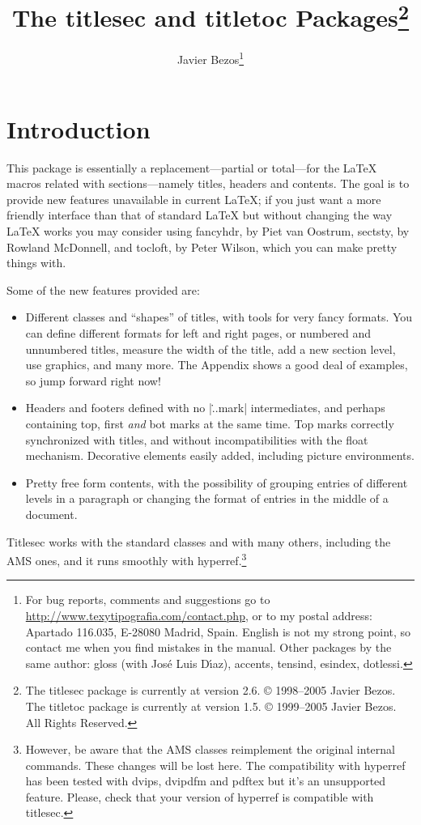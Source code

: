 \documentclass[a4paper]{ltxguide}
\title{The \textsf{titlesec} and \textsf{titletoc} 
Packages\footnote{The \textsf{titlesec} package is currently at 
version 2.6.  \copyright{} 1998--2005 Javier Bezos.
The \textsf{titletoc} package is currently at 
version 1.5.  \copyright{} 1999--2005 Javier Bezos.  All Rights 
Reserved.}}
\author{Javier Bezos\footnote{For bug reports, comments and
suggestions go to \href{http://www.texytipografia.com/contact.php}%
{http://www.texytipografia.com/contact.php},
or to my postal address: Apartado 116.035, E-28080 Madrid, Spain.
English is not my strong point, so contact me when you find mistakes
in the manual.  Other packages by the same author: \textsf{gloss}
(with Jos\'e Luis D\'{\i}az), \textsf{accents, tensind, esindex,
dotlessi}.}}
\date{\docdate}
\begin{document}
\maketitle
\tableofcontents
\section{Introduction}

This package is essentially a replacement---partial or total---for the 
\LaTeX{} macros related with sections---namely titles, headers and 
contents.  The goal is to provide new features unavailable in current 
\LaTeX{}; if you just want a more friendly interface than that of 
standard \LaTeX{} but without changing the way \LaTeX{} works you may 
consider using \textsf{fancyhdr}, by Piet van Oostrum, \textsf{sectsty},
by Rowland McDonnell, and \textsf{tocloft}, by Peter Wilson, which you
can make pretty things with.

Some of the new features provided are:
\begin{itemize}
\item Different classes and ``shapes'' of titles, with tools for very 
fancy formats.  You can define different formats for left and right 
pages, or numbered and unnumbered titles, measure the width of the 
title, add a new section level, use graphics, and many more.  The 
Appendix shows a good deal of examples, so jump forward right now!

\item Headers and footers defined with no |\...mark| intermediates,
and perhaps containing top, first \emph{and} bot marks at the same time.
Top marks correctly synchronized with titles, and without 
incompatibilities with the float mechanism. Decorative elements easily
added, including picture environments.

\item Pretty free form contents, with the possibility of grouping 
entries of different levels in a paragraph or changing the format
of entries in the middle of a document.
\end{itemize}
\textsf{Titlesec} works with the standard classes and with many
others, including the AMS ones, and it runs smoothly with
\textsf{hyperref}.\footnote{However, be aware that the AMS classes
reimplement the original internal commands.  These changes will be
lost here.  The compatibility with \textsf{hyperref} has been tested
with \textsf{dvips}, \textsf{dvipdfm} and \textsf{pdftex} but it's an
unsupported feature.  Please, check that your version of
\textsf{hyperref} is compatible with \textsf{titlesec}.}
\end{document}
